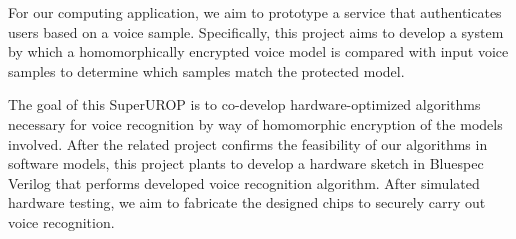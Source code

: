 \documentclass[11pt]{article}
\begin{document}
For our computing application, we aim to prototype a service that authenticates users based on a voice sample. Specifically, this project aims to develop a system by which a homomorphically encrypted voice model is compared with input voice samples to determine which samples match the protected model.

The goal of this SuperUROP is to co-develop hardware-optimized algorithms necessary for voice recognition by way of homomorphic encryption of the models involved. After the related project confirms the feasibility of our algorithms in software models, this project plants to develop a hardware sketch in Bluespec Verilog that performs developed voice recognition algorithm. After simulated hardware testing, we aim to fabricate the designed chips to securely carry out voice recognition.
\end{document}
